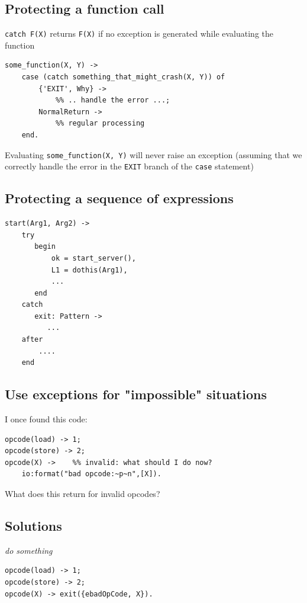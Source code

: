 \documentclass[12pt]{article}
\begin{document}
\subsection{Protecting a function call}

\verb+catch F(X)+ returns \verb+F(X)+ if no exception is generated
while evaluating the function

\begin{verbatim}
some_function(X, Y) ->
    case (catch something_that_might_crash(X, Y)) of
        {'EXIT', Why} -> 
            %% .. handle the error ...;
        NormalReturn ->
            %% regular processing
    end.
\end{verbatim}

Evaluating \verb+some_function(X, Y)+ will never raise an exception
(assuming that we correctly handle the error in the \verb+EXIT+ branch
of the \verb+case+ statement)

\subsection{Protecting a sequence of expressions}

\begin{verbatim}
start(Arg1, Arg2) ->
    try 
       begin
           ok = start_server(),
           L1 = dothis(Arg1),
           ...
       end
    catch
       exit: Pattern ->
          ...
    after
        ....
    end
\end{verbatim}

\subsection{Use exceptions for "impossible" situations}

I once found this code:

\begin{verbatim}
opcode(load) -> 1;
opcode(store) -> 2;
opcode(X) ->    %% invalid: what should I do now?
    io:format("bad opcode:~p~n",[X]).
\end{verbatim}

What does this return for invalid opcodes?

\subsection{Solutions}

{\sl do something}

\begin{verbatim}
opcode(load) -> 1;
opcode(store) -> 2;
opcode(X) -> exit({ebadOpCode, X}).
\end{verbatim}
\end{document}

